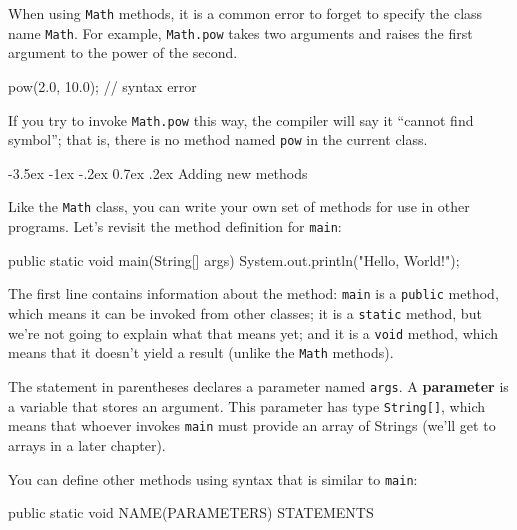 \documentclass[12pt]{book}
\makeatletter
\theoremstyle{exercise}
\newcommand{\java}[1]{\verb"#1"}
\renewcommand{\section}{\@startsection{section}{1}{\z@}%
    {-3.5ex \@plus -1ex \@minus -.2ex}%
    {0.7ex \@plus.2ex}%
    {\normalfont\Large\bfseries}}
\newcommand{\java}[1]{\lstinline{#1}} %
\makeatother
\begin{document}
When using \java{Math} methods, it is a common error to forget to specify the class name \java{Math}.
For example, \java{Math.pow} takes two arguments and raises the first argument to the power of the second.

\begin{code}
    pow(2.0, 10.0);  // syntax error
\end{code}

If you try to invoke \java{Math.pow} this way, the compiler will say it ``cannot find symbol''; that is, there is no method named \java{pow} in the current class.


\section{Adding new methods}
\label{adding_methods}


Like the \java{Math} class, you can write your own set of methods for use in other programs.
Let's revisit the method definition for \java{main}:

\begin{code}
    public static void main(String[] args) {
        System.out.println("Hello, World!");
    }
\end{code}


The first line contains information about the method:
\java{main} is a \java{public} method, which means it can be invoked from other classes;
it is a \java{static} method, but we're not going to explain what that means yet;
and it is a \java{void} method, which means that it doesn't yield a result (unlike the \java{Math} methods).


The statement in parentheses declares a parameter named \java{args}.
A {\bf parameter} is a variable that stores an argument.
This parameter has type \java{String[]}, which means that whoever invokes \java{main} must provide an array of Strings (we'll get to arrays in a later chapter).

You can define other methods using syntax that is similar to \java{main}:

\begin{code}
    public static void NAME(PARAMETERS) {
        STATEMENTS
    }
\end{code}
\end{document}
